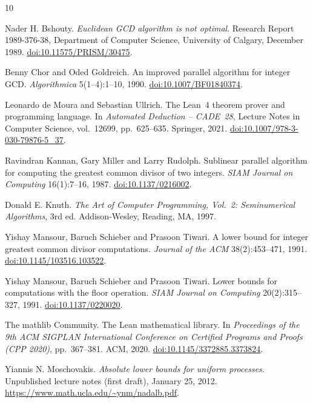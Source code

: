 \documentclass[11pt]{article}
\theoremstyle{remark}
\begin{document}
\begin{thebibliography}{10}
\raggedright
{}
Nader H. Bshouty.
\emph{Euclidean GCD algorithm is not optimal}.
Research Report 1989-376-38, Department of Computer Science, University of
Calgary, December 1989.
\href{https://doi.org/10.11575/PRISM/30475}{doi:10.11575/\allowbreak PRISM/30475}.

Benny Chor and Oded Goldreich.
An improved parallel algorithm for integer GCD.
\emph{Algorithmica} 5(1--4):1--10, 1990.
\href{https://doi.org/10.1007/BF01840374}{doi:10.1007/BF01840374}.

Leonardo de Moura and Sebastian Ullrich.
The Lean~4 theorem prover and programming language.
In \emph{Automated Deduction -- CADE~28}, Lecture Notes in Computer Science,
vol.~12699, pp.~625--635. Springer, 2021.
\href{https://doi.org/10.1007/978-3-030-79876-5_37}{doi:10.1007/978-3-030-79876-5\_37}.

Ravindran Kannan, Gary Miller and Larry Rudolph.
Sublinear parallel algorithm for computing the greatest common divisor of
two integers.
\emph{SIAM Journal on Computing} 16(1):7--16, 1987.
\href{https://doi.org/10.1137/0216002}{doi:10.1137/0216002}.

Donald E. Knuth.
\emph{The Art of Computer Programming, Vol.~2: Seminumerical Algorithms}, 3rd
ed. Addison-Wesley, Reading, MA, 1997.

Yishay Mansour, Baruch Schieber and Prasoon Tiwari.
A lower bound for integer greatest common divisor computations.
\emph{Journal of the ACM} 38(2):453--471, 1991.
\href{https://doi.org/10.1145/103516.103522}{doi:10.1145/103516.103522}.

Yishay Mansour, Baruch Schieber and Prasoon Tiwari.
Lower bounds for computations with the floor operation.
\emph{SIAM Journal on Computing} 20(2):315--327, 1991.
\href{https://doi.org/10.1137/0220020}{doi:10.1137/0220020}.

The mathlib Community.
The Lean mathematical library.
In \emph{Proceedings of the 9th ACM SIGPLAN International Conference on
Certified Programs and Proofs (CPP 2020)}, pp.~367--381. ACM, 2020.
\href{https://doi.org/10.1145/3372885.3373824}{doi:10.1145/3372885.3373824}.

Yiannis N. Moschovakis.
\emph{Absolute lower bounds for uniform processes}.
Unpublished lecture notes (first draft), January 25, 2012.
\url{https://www.math.ucla.edu/~ynm/nadalb.pdf}.


\end{thebibliography}
\end{document}
